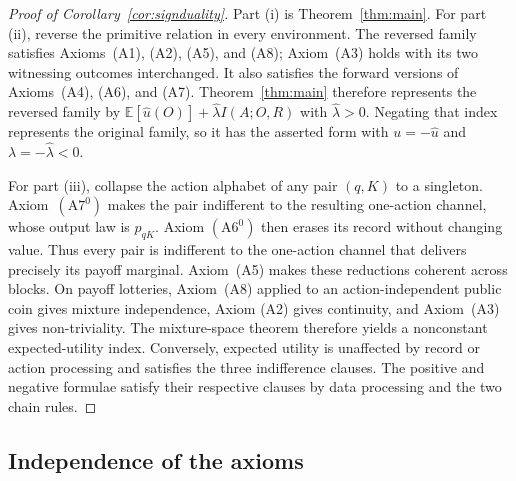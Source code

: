 \documentclass[11pt,a4paper]{article}
\theoremstyle{definition}
\newcommand{\E}{\mathbb E}
\newcommand{\I}{I}
\newcommand{\1}{\mathbf 1}
\begin{document}
\begin{proof}[Proof of Corollary~\ref{cor:signduality}]
Part \textup{(i)} is Theorem~\ref{thm:main}.  For part \textup{(ii)}, reverse
the primitive relation in every environment.  The reversed family satisfies
Axioms~\textup{(A1)}, \textup{(A2)}, \textup{(A5)}, and \textup{(A8)}; Axiom~\textup{(A3)} holds with
its two witnessing outcomes interchanged.  It also satisfies the forward
versions of Axioms~\textup{(A4)}, \textup{(A6)}, and
\textup{(A7)}.  Theorem~\ref{thm:main} therefore represents the reversed
family by
\(
  \E[\widehat u(O)]+\widehat\lambda\I(A;O,R)
\)
with \(\widehat\lambda>0\).  Negating that index represents the original
family, so it has the asserted form with
\(u=-\widehat u\) and \(\lambda=-\widehat\lambda<0\).

For part \textup{(iii)}, collapse the action alphabet of any pair $(q,K)$ to
a singleton.  Axiom~$(\mathrm{A}7^0)$ makes the pair indifferent to the
resulting one-action channel, whose output law is $p_{qK}$.  Axiom
$(\mathrm{A}6^0)$ then erases its record without changing value.  Thus every
pair is indifferent to the one-action channel that delivers precisely its
payoff marginal.  Axiom~\textup{(A5)} makes these reductions coherent across
blocks.  On payoff lotteries, Axiom~\textup{(A8)} applied to an
action-independent public coin gives mixture independence, Axiom
\textup{(A2)} gives continuity, and Axiom~\textup{(A3)} gives
non-triviality.  The mixture-space theorem therefore yields a nonconstant
expected-utility index.  Conversely, expected utility is unaffected by record
or action processing and satisfies the three indifference clauses.  The
positive and negative formulae satisfy their respective clauses by data
processing and the two chain rules.
\end{proof}

\subsection{Independence of the axioms}\label{app:axiom-independence}
\end{document}
